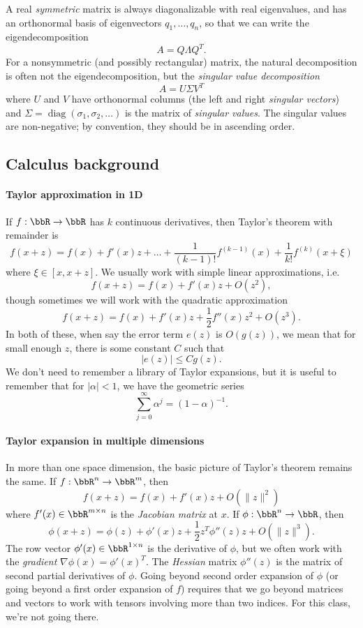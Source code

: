 \documentclass[12pt, leqno]{article}
\begin{document}
A real {\em symmetric} matrix is always diagonalizable with real
eigenvalues, and has an orthonormal basis of eigenvectors $q_1,
\ldots, q_n$, so that we can write the eigendecomposition
\[
  A = Q \Lambda Q^T.
\]
For a nonsymmetric (and possibly rectangular) matrix, the natural
decomposition is often not the eigendecomposition, but
the {\em singular value decomposition}
\[
  A = U \Sigma V^T
\]
where $U$ and $V$ have orthonormal columns (the left and right {\em
  singular vectors}) and $\Sigma = \operatorname{diag}(\sigma_1,
\sigma_2, \ldots)$ is the matrix of {\em singular values}.
The singular values are non-negative; by convention, they should
be in ascending order.

\subsection{Calculus background}

\paragraph{Taylor approximation in 1D}
If $f : \bbR \rightarrow \bbR$ has $k$ continuous derivatives, then
Taylor's theorem with remainder is
\[
  f(x+z) = f(x) + f'(x) z + \ldots + \frac{1}{(k-1)!} f^{(k-1)}(x) +
           \frac{1}{k!} f^{(k)}(x+\xi)
\]
where $\xi \in [x, x+z]$.  We usually work with simple linear
approximations, i.e.
\[
  f(x+z) = f(x) + f'(x) z + O(z^2),
\]
though sometimes we will work with the quadratic approximation
\[
  f(x+z) = f(x) + f'(x) z + \frac{1}{2} f''(x) z^2 + O(z^3).
\]
In both of these, when say the error term $e(z)$ is $O(g(z))$, we mean
that for small enough $z$, there is some constant $C$ such that
\[
  |e(z)| \leq C g(z).
\]
We don't need to remember a library of Taylor expansions, but it is
useful to remember that for $|\alpha| < 1$, we have the geometric series
\[
  \sum_{j=0}^\infty \alpha^j = (1-\alpha)^{-1}.
\]

\paragraph{Taylor expansion in multiple dimensions}
In more than one space dimension, the basic picture of Taylor's
theorem remains the same.  If $f : \bbR^n \rightarrow \bbR^m$, then
\[
  f(x+z) = f(x) + f'(x) z + O(\|z\|^2)
\]
where $f'(x) \in \bbR^{m \times n}$ is the {\em Jacobian matrix}
at $x$.  If $\phi : \bbR^n \rightarrow \bbR$, then
\[
  \phi(x+z) = \phi(z) + \phi'(x) z + \frac{1}{2} z^T \phi''(z) z + O(\|z\|^3).
\]
The row vector $\phi'(x) \in \bbR^{1 \times n}$ is the derivative of
$\phi$, but we often work with the {\em gradient} $\nabla \phi(x) =
\phi'(x)^T$.  The {\em Hessian} matrix $\phi''(z)$ is the matrix of
second partial derivatives of $\phi$.  Going beyond second order
expansion of $\phi$ (or going beyond a first order expansion of $f$)
requires that we go beyond matrices and vectors to
work with tensors involving more than two indices.  For this class,
we're not going there.
\end{document}
